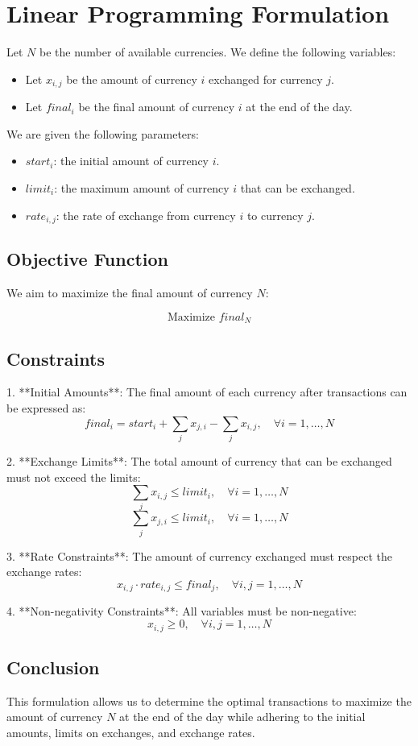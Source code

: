 \documentclass{article}
\begin{document}
\section*{Linear Programming Formulation}

Let \( N \) be the number of available currencies. We define the following variables:

\begin{itemize}
    \item Let \( x_{i,j} \) be the amount of currency \( i \) exchanged for currency \( j \).
    \item Let \( final_i \) be the final amount of currency \( i \) at the end of the day.
\end{itemize}

We are given the following parameters:

\begin{itemize}
    \item \( start_i \): the initial amount of currency \( i \).
    \item \( limit_i \): the maximum amount of currency \( i \) that can be exchanged.
    \item \( rate_{i,j} \): the rate of exchange from currency \( i \) to currency \( j \).
\end{itemize}

\subsection*{Objective Function}

We aim to maximize the final amount of currency \( N \):

\[
\text{Maximize } final_N
\]

\subsection*{Constraints}

1. **Initial Amounts**:
   The final amount of each currency after transactions can be expressed as:
   \[
   final_i = start_i + \sum_{j} x_{j,i} - \sum_{j} x_{i,j}, \quad \forall i = 1, \ldots, N
   \]

2. **Exchange Limits**:
   The total amount of currency that can be exchanged must not exceed the limits:
   \[
   \sum_{j} x_{i,j} \leq limit_i, \quad \forall i = 1, \ldots, N
   \]
   \[
   \sum_{j} x_{j,i} \leq limit_i, \quad \forall i = 1, \ldots, N
   \]

3. **Rate Constraints**:
   The amount of currency exchanged must respect the exchange rates:
   \[
   x_{i,j} \cdot rate_{i,j} \leq final_j, \quad \forall i,j = 1, \ldots, N
   \]

4. **Non-negativity Constraints**:
   All variables must be non-negative:
   \[
   x_{i,j} \geq 0, \quad \forall i,j = 1, \ldots, N
   \]

\subsection*{Conclusion}

This formulation allows us to determine the optimal transactions to maximize the amount of currency \( N \) at the end of the day while adhering to the initial amounts, limits on exchanges, and exchange rates.
\end{document}
